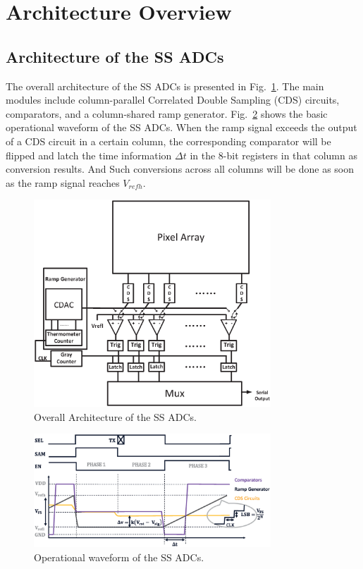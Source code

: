 \documentclass[conference]{IEEEtran}
\begin{document}
\section{Architecture Overview}\label{architecture}

\subsection{Architecture of the SS ADCs}

The overall architecture of the SS ADCs is presented in Fig.~\ref{SSADC}. The main modules include column-parallel Correlated Double Sampling (CDS) circuits, comparators, and a column-shared ramp generator. Fig.~\ref{SSWAVE} shows the basic operational waveform of the SS ADCs. When the ramp signal exceeds the output of a CDS circuit in a certain column, the corresponding comparator will be flipped and latch the time information $\Delta t$ in the 8-bit registers in that column as conversion results. And Such conversions across all columns will be done as soon as the ramp signal reaches $V_{refh}$.
\begin{figure}[htbp]
	\centerline{\includegraphics[width=3.5in]{./Figures/SSADC.eps}}
	\caption{Overall Architecture of the SS ADCs.}
	\label{SSADC}
\end{figure} 
\begin{figure}[htbp]
	\centerline{\includegraphics[width=3.5in]{./Figures/SSWAVE.eps}}
	\caption{Operational waveform of the SS ADCs.}
	\label{SSWAVE}
\end{figure}
\end{document}
